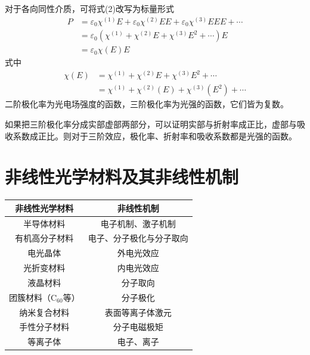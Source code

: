 \documentclass{beamer}
\renewcommand\epsilon{\varepsilon}
\newenvironment{slide}{
    \begin{frame}{\bfseries{\sectiontitle}}
}{
    \end{frame}
}
\let\sectiononly\section
\renewcommand{\section}[1]{
    \sectiononly{#1}
    \let\sectiontitle\relax
    \newcommand{\sectiontitle}{#1}
}
\begin{document}
\begin{slide}
    对于各向同性介质，可将式(2)改写为标量形式
    \begin{equation}
    \begin{aligned}
        P
        &= \epsilon_0\chi^{(1)}E + \epsilon_0\chi^{(2)}EE + \epsilon_0\chi^{(3)}EEE+\cdots \\
        &= \epsilon_0\left(\chi^{(1)} + \chi^{(2)}E+\chi^{(3)}E^2+\cdots\right)E \\
        &= \epsilon_0\chi(E)E
    \end{aligned}
    \end{equation}
    式中
    \begin{equation}
    \begin{aligned}
        \chi(E)
        &= \chi^{(1)} + \chi^{(2)}E + \chi^{(3)}E^2 + \cdots \\
        &= \chi^{(1)} + \chi^{(2)}\left(E\right) + \chi^{(3)}\left(E^2\right) + \cdots
    \end{aligned}
    \end{equation}
    二阶极化率为光电场强度的函数，三阶极化率为光强的函数，它们皆为复数。

    如果把三阶极化率分成实部虚部两部分，可以证明实部与折射率成正比，虚部与吸收系数成正比。则对于三阶效应，极化率、折射率和吸收系数都是光强的函数。
\end{slide}

\section{非线性光学材料及其非线性机制}

\begin{slide}
    \begin{table}[ht!]
        \centering
        \begin{tabular}{cc}
            \toprule
            非线性光学材料 & 非线性机制 \\
            \midrule
            半导体材料 & 电子机制、激子机制 \\
            有机高分子材料 & 电子、分子极化与分子取向 \\
            电光晶体 & 外电光效应 \\
            光折变材料 & 内电光效应 \\
            液晶材料 & 分子取向 \\
            团簇材料（$\mathrm{C}_{60}$等） & 分子极化 \\
            纳米复合材料 & 表面等离子体激元 \\
            手性分子材料 & 分子电磁极矩 \\
            等离子体 & 电子、离子 \\
            \bottomrule
        \end{tabular}
    \end{table}
\end{slide}
\end{document}

